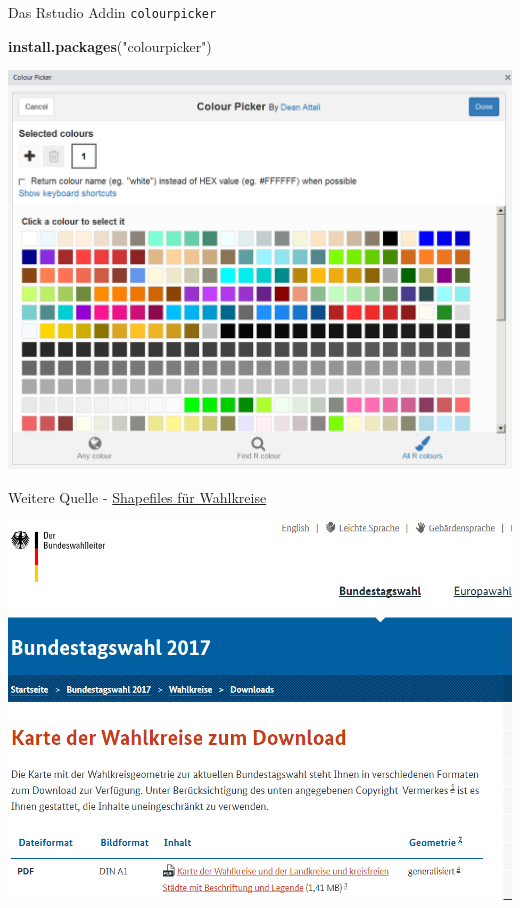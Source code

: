 \documentclass[ignorenonframetext,]{beamer}
\newenvironment{Shaded}{\begin{snugshade}}{\end{snugshade}}
\newcommand{\KeywordTok}[1]{\textcolor[rgb]{0.13,0.29,0.53}{\textbf{#1}}}
\newcommand{\NormalTok}[1]{#1}
\newcommand{\StringTok}[1]{\textcolor[rgb]{0.31,0.60,0.02}{#1}}
\begin{document}
\begin{frame}[fragile]{Das Rstudio Addin \texttt{colourpicker}}
\protect\hypertarget{das-rstudio-addin-colourpicker}{}

\begin{Shaded}
\begin{Highlighting}[]
\KeywordTok{install.packages}\NormalTok{(}\StringTok{"colourpicker"}\NormalTok{)}
\end{Highlighting}
\end{Shaded}

\includegraphics{figure/colourpicker.PNG}

\end{frame}

\begin{frame}{Weitere Quelle -
\href{https://www.bundeswahlleiter.de/bundestagswahlen/2017/wahlkreiseinteilung/downloads.html}{Shapefiles
für Wahlkreise}}
\protect\hypertarget{weitere-quelle---shapefiles-fur-wahlkreise}{}

\includegraphics{figure/shapefiles_btw.PNG}

\end{frame}
\end{document}
